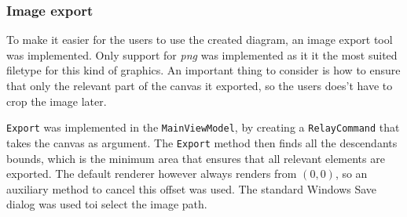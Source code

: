 \subsubsection{Image export}

To make it easier for the users to use the created diagram, an image export tool
was implemented. Only support for \textit{png} was implemented as it it
the most suited filetype for this kind of graphics. An important thing to consider
is how to ensure that only the relevant part of the canvas it exported, so
the users does't have to crop the image later.

\texttt{Export} was implemented in the \texttt{MainViewModel}, by creating a
\texttt{RelayCommand} that takes the canvas as argument.
The \texttt{Export} method then finds all the  descendants bounds, which is 
the minimum area that ensures that all relevant elements are exported. The
default renderer however always renders from $(0,0)$, so an auxiliary method to
cancel this offset was used. The standard Windows Save dialog was used toi
select the image path.

